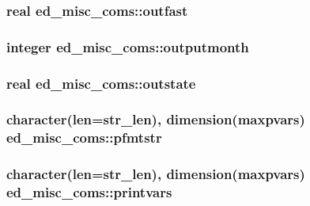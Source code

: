 \subsubsection[{\texorpdfstring{outfast}{outfast}}]{\setlength{\rightskip}{0pt plus 5cm}real ed\+\_\+misc\+\_\+coms\+::outfast}\hypertarget{namespaceed__misc__coms_ae09f2e8832d84578b31d14be102b09a0}{}\label{namespaceed__misc__coms_ae09f2e8832d84578b31d14be102b09a0}
\subsubsection[{\texorpdfstring{outputmonth}{outputmonth}}]{\setlength{\rightskip}{0pt plus 5cm}integer ed\+\_\+misc\+\_\+coms\+::outputmonth}\hypertarget{namespaceed__misc__coms_a748c85614a28e87c39dc53fa6ab1b9a0}{}\label{namespaceed__misc__coms_a748c85614a28e87c39dc53fa6ab1b9a0}
\subsubsection[{\texorpdfstring{outstate}{outstate}}]{\setlength{\rightskip}{0pt plus 5cm}real ed\+\_\+misc\+\_\+coms\+::outstate}\hypertarget{namespaceed__misc__coms_ae530849702ef966f40e0afc4f65b1375}{}\label{namespaceed__misc__coms_ae530849702ef966f40e0afc4f65b1375}
\subsubsection[{\texorpdfstring{pfmtstr}{pfmtstr}}]{\setlength{\rightskip}{0pt plus 5cm}character(len=str\+\_\+len), dimension(maxpvars) ed\+\_\+misc\+\_\+coms\+::pfmtstr}\hypertarget{namespaceed__misc__coms_aed54f9188bbb97c53b47547c92b42e8c}{}\label{namespaceed__misc__coms_aed54f9188bbb97c53b47547c92b42e8c}
\subsubsection[{\texorpdfstring{printvars}{printvars}}]{\setlength{\rightskip}{0pt plus 5cm}character(len=str\+\_\+len), dimension(maxpvars) ed\+\_\+misc\+\_\+coms\+::printvars}\hypertarget{namespaceed__misc__coms_abeda9131f5dae12b63b8d2521319f87d}{}\label{namespaceed__misc__coms_abeda9131f5dae12b63b8d2521319f87d}
